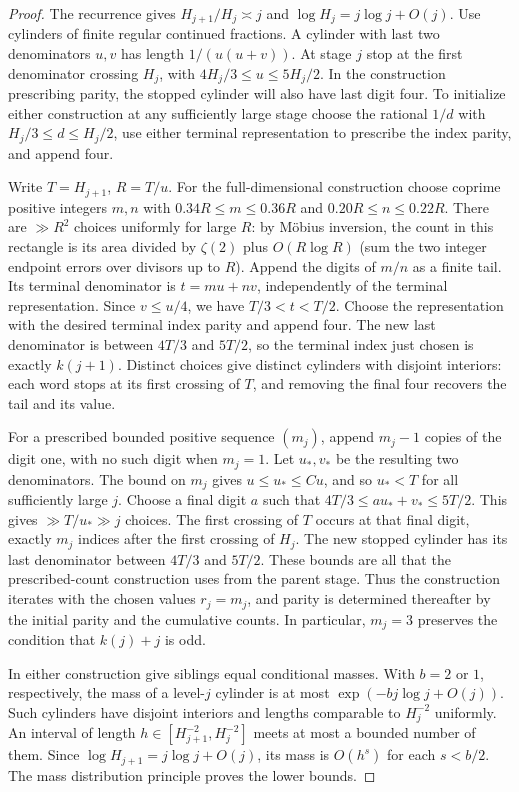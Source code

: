 \documentclass[11pt]{article}
\theoremstyle{definition}
\theoremstyle{remark}
\begin{document}
\begin{proof}
The recurrence gives $H_{j+1}/H_j\asymp j$ and
$\log H_j=j\log j+O(j)$. Use cylinders of finite regular continued
fractions. A cylinder with last two denominators $u,v$ has length
$1/(u(u+v))$. At stage $j$ stop at the first denominator crossing $H_j$,
with $4H_j/3\le u\le 5H_j/2$. In the construction prescribing
parity, the stopped cylinder will also have last digit four.
To initialize either construction at any sufficiently large stage choose the rational $1/d$
with $H_j/3\le d\le H_j/2$, use either terminal representation to
prescribe the index parity, and append four.

Write $T=H_{j+1}$, $R=T/u$. For the full-dimensional construction
choose coprime positive integers $m,n$ with
$0.34R\le m\le0.36R$ and $0.20R\le n\le0.22R$.
There are $\gg R^2$ choices uniformly for large $R$: by
M\"obius inversion, the count in this rectangle is its area divided
by $\zeta(2)$ plus $O(R\log R)$ (sum the two integer endpoint errors
over divisors up to $R$). Append the digits of $m/n$ as a finite tail.
Its terminal denominator is $t=mu+nv$, independently of the terminal
representation. Since $v\le u/4$, we have $T/3<t<T/2$.
Choose the representation with the desired terminal index parity and
append four. The new last denominator is between $4T/3$ and $5T/2$,
so the terminal index just chosen is exactly $k(j+1)$.
Distinct choices give distinct cylinders with disjoint interiors:
each word stops at its first crossing of $T$, and removing the final
four recovers the tail and its value.

For a prescribed bounded positive sequence $(m_j)$, append
$m_j-1$ copies of the digit one, with no such digit when $m_j=1$.
Let $u_*,v_*$ be the resulting two denominators. The bound on
$m_j$ gives $u\le u_*\le C u$, and so $u_*<T$ for all sufficiently
large $j$. Choose a final digit $a$ such that
$4T/3\le a u_*+v_*\le5T/2$. This gives $\gg T/u_*\gg j$ choices.
The first crossing of $T$ occurs at that final digit, exactly
$m_j$ indices after the first crossing of $H_j$. The new stopped
cylinder has its last denominator between $4T/3$ and $5T/2$.
These bounds are all that the prescribed-count construction uses
from the parent stage. Thus the construction iterates with the
chosen values $r_j=m_j$, and parity is determined thereafter by
the initial parity and the cumulative counts. In particular,
$m_j=3$ preserves the condition that $k(j)+j$ is odd.

In either construction give siblings equal conditional masses.
With $b=2$ or $1$, respectively, the mass of a level-$j$ cylinder
is at most $\exp(-bj\log j+O(j))$. Such cylinders have disjoint
interiors and lengths comparable to $H_j^{-2}$ uniformly. An interval
of length $h\in[H_{j+1}^{-2},H_j^{-2}]$ meets at most a bounded number
of them. Since $\log H_{j+1}=j\log j+O(j)$, its mass is $O(h^s)$
for each $s<b/2$. The mass distribution principle proves the lower bounds.


\end{proof}
\end{document}
